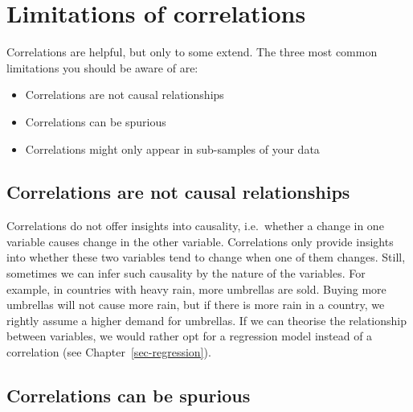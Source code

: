 \documentclass[
  letterpaper,
  DIV=11,
  numbers=noendperiod]{scrreprt}
\begin{document}
\section{Limitations of
correlations}\label{sec-limitations-of-correlations}

Correlations are helpful, but only to some extend. The three most common
limitations you should be aware of are:

\begin{itemize}
\item
  Correlations are not causal relationships
\item
  Correlations can be spurious
\item
  Correlations might only appear in sub-samples of your data
\end{itemize}

\subsection{Correlations are not causal
relationships}\label{sec-correlations-are-not-causal-relationships}

Correlations do not offer insights into causality, i.e.~whether a change
in one variable causes change in the other variable. Correlations only
provide insights into whether these two variables tend to change when
one of them changes. Still, sometimes we can infer such causality by the
nature of the variables. For example, in countries with heavy rain, more
umbrellas are sold. Buying more umbrellas will not cause more rain, but
if there is more rain in a country, we rightly assume a higher demand
for umbrellas. If we can theorise the relationship between variables, we
would rather opt for a regression model instead of a correlation (see
Chapter~\ref{sec-regression}).

\subsection{Correlations can be
spurious}\label{sec-correlations-can-be-spurious}
\end{document}
